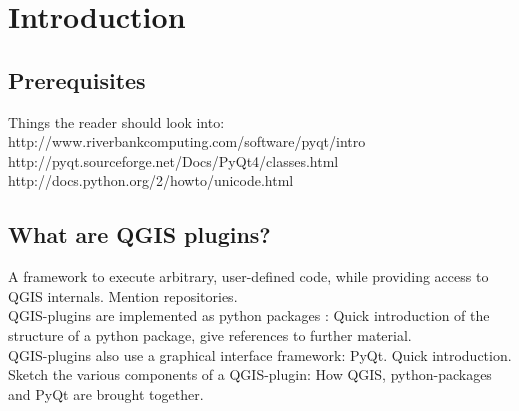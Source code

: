 \section{Introduction}
\label{sect:introduction}

\subsection{Prerequisites}
\label{ssect:prerequisites}
Things the reader should look into:\\
http://www.riverbankcomputing.com/software/pyqt/intro \\
http://pyqt.sourceforge.net/Docs/PyQt4/classes.html \\
http://docs.python.org/2/howto/unicode.html

\subsection{What are QGIS plugins?}
\par
A framework to execute arbitrary, user-defined code, while providing access to QGIS internals. Mention repositories.\\
QGIS-plugins are implemented as python packages : Quick introduction of the structure of a python package, give references to further material.\\
QGIS-plugins also use a graphical interface framework: PyQt. Quick introduction.\\
Sketch the various components of a QGIS-plugin: How QGIS, python-packages and PyQt are brought together.


